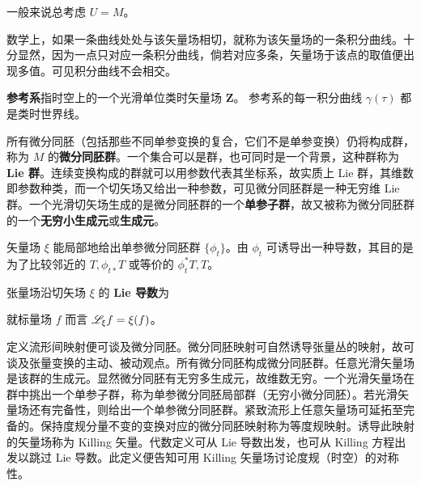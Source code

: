 一般来说总考虑 $U=M$。






数学上，如果一条曲线处处与该矢量场相切，就称为该矢量场的一条积分曲线。十分显然，因为一点只对应一条积分曲线，倘若对应多条，矢量场于该点的取值便出现多值。可见积分曲线不会相交。

\textbf{参考系}指时空上的一个光滑单位类时矢量场 $\bm Z$。
参考系的每一积分曲线 $\gamma(\tau)$ 都是类时世界线。





所有微分同胚（包括那些不同单参变换的复合，它们不是单参变换）仍将构成群，称为 $M$ 的\textbf{微分同胚群}。一个集合可以是群，也可同时是一个背景，这种群称为 \textbf{Lie 群}。连续变换构成的群就可以用参数代表其坐标系，故实质上 Lie 群，其维数即参数种类，而一个切矢场又给出一种参数，可见微分同胚群是一种无穷维 Lie 群。一个光滑切矢场生成的是微分同胚群的一个\textbf{单参子群}，故又被称为微分同胚群的一个\textbf{无穷小生成元}或\textbf{生成元}。

矢量场 $\xi$ 能局部地给出单参微分同胚群 $\{\phi_t\}$。由 $\phi_t$ 可诱导出一种导数，其目的是为了比较邻近的 $T,\phi_{t*} T$ 或等价的 $\phi_t^*T,T$。
\begin{definition}
    张量场沿切矢场 $\xi$ 的 \textbf{Lie 导数}为
\end{definition}

\begin{example}
    就标量场 $f$ 而言 $\mathscr{L}_\xi f=\xi(f)$。
\end{example}


定义流形间映射便可谈及微分同胚。微分同胚映射可自然诱导张量丛的映射，故可谈及张量变换的主动、被动观点。所有微分同胚构成微分同胚群。任意光滑矢量场是该群的生成元。显然微分同胚有无穷多生成元，故维数无穷。一个光滑矢量场在群中挑出一个单参子群，称为单参微分同胚局部群（无穷小微分同胚）。若光滑矢量场还有完备性，则给出一个单参微分同胚群。紧致流形上任意矢量场可延拓至完备的。保持度规分量不变的变换对应的微分同胚映射称为等度规映射。诱导此映射的矢量场称为 Killing 矢量。代数定义可从 Lie 导数出发，也可从 Killing 方程出发以跳过 Lie 导数。此定义便告知可用 Killing 矢量场讨论度规（时空）的对称性。

